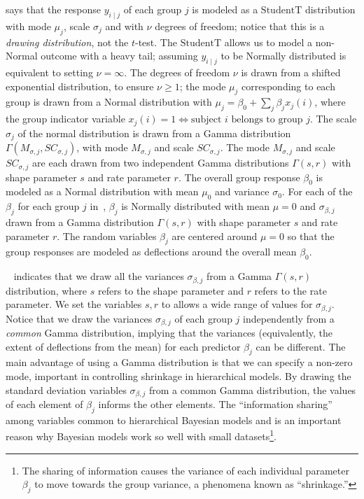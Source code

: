  says that the response $y_{i \mid j}$ of each group $j$ is modeled as a $\mathrm{StudentT}$ distribution with mode $\mu_j$,  scale $\sigma_j$ and with $\nu$ degrees of freedom; notice that this is a \textit{drawing distribution}, not the $t$-test. The $\mathrm{StudentT}$ allows us to model a non-Normal outcome with a heavy tail; assuming $y_{i \mid j}$ to be Normally distributed is equivalent to setting $\nu=\infty$. The degrees of freedom $\nu$ is drawn from a shifted exponential distribution, to ensure $\nu \geq 1$; the mode $\mu_j$ corresponding to each group is drawn from a Normal distribution with $\mu_j = \beta_0 + \sum_j \beta_j x_j(i)$, where the group indicator variable $x_j(i)=1 \iff \text{subject } i \text{ belongs to group } j$. The scale $\sigma_j$ of the normal distribution is drawn from a Gamma distribution $\Gamma(M_{\sigma, j}, SC_{\sigma, j})$, with mode $M_{\sigma, j}$ and scale $SC_{\sigma, j}$. The mode $M_{\sigma, j}$ and scale $SC_{\sigma, j}$ are each drawn from two independent Gamma distributions $\Gamma(s,r)$ with shape parameter $s$ and rate parameter $r$. The overall group response $\beta_0$ is modeled as a Normal distribution with mean $\mu_0$ and variance $\sigma_0$. For each of the $\beta_j$ for each group $j$ in~, $\beta_j$ is Normally distributed with mean $\mu=0$ and $\sigma_{\beta, j}$ drawn from a Gamma distribution $\Gamma(s,r)$ with shape parameter $s$ and rate parameter $r$. The random variables $\beta_j$ are centered around $\mu=0$ so that the group responses are modeled as deflections around the overall mean $\beta_0$. 

~ indicates that we draw all the variances $\sigma_{\beta, j}$ from a Gamma $\Gamma(s,r)$ distribution, where $s$ refers to the shape parameter and $r$ refers to the rate parameter. We set the variables $s,r$ to allows a wide range of values for $\sigma_{\beta, j}$. Notice that we draw the variances $\sigma_{\beta, j}$ of each group $j$ independently from a \textit{common} Gamma distribution, implying that the variances (equivalently, the extent of deflections from the mean) for each predictor $\beta_j$ can be different. The main advantage of using a Gamma distribution is that we can specify a non-zero mode, important in controlling shrinkage in hierarchical models. By drawing the standard deviation variables $\sigma_{\beta, j}$ from a common Gamma distribution, the values of each element of $\beta_j$ informs the other elements. The ``information sharing'' among variables common to hierarchical Bayesian models and is an important reason why Bayesian models work so well with small datasets\footnote{The sharing of information causes the variance of each individual parameter $\beta_{j}$ to move towards the group variance, a phenomena known as ``shrinkage.'' }.

